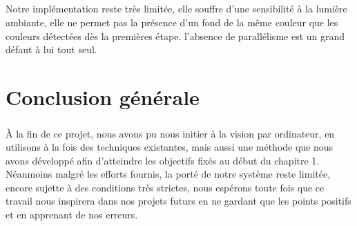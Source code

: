 \documentclass[12pt]{report}
\begin{document}
	\paragraph{}
	Notre implémentation reste très limitée, elle souffre d'une sensibilité à la lumière
	ambiante, elle ne permet pas la présence d'un fond de la même couleur que les couleurs
	détectées dès la premières étape. l'absence de parallélisme est un grand défaut à lui
	tout seul.
\chapter{Conclusion générale}
\paragraph{}
À la fin de ce projet, nous avons pu nous initier à la vision par ordinateur, en utilisons à la fois
des techniques existantes, mais aussi une méthode que nous avons développé afin d'atteindre les
objectifs fixés au début du chapitre 1. Néanmoins malgré les efforts fournis, la porté de notre système
reste limitée, encore sujette à des conditions très strictes, nous espérons toute fois que ce travail
nous inspirera dans nos projets futurs en ne gardant que les points positifs et en apprenant de nos erreurs.
\end{document}
